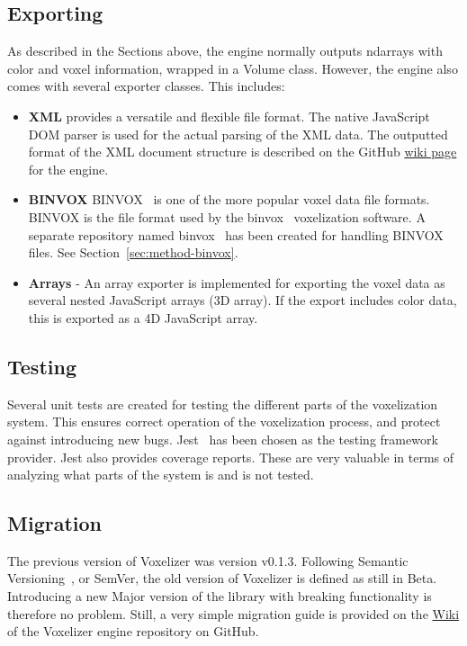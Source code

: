 \subsection{Exporting}
As described in the Sections above, the engine normally outputs ndarrays with color and voxel information, wrapped in a Volume class. However, the engine also comes with several exporter classes. This includes:
\begin{itemize}
    \item \textbf{XML} provides a versatile and flexible file format. The native JavaScript DOM parser is used for the actual parsing of the XML data. The outputted format of the XML document structure is described on the GitHub \href{https://github.com/andstor/voxelizer/wiki/XML-format}{wiki page} for the engine.
    \item \textbf{BINVOX} BINVOX~\cite{binvox-file-format} is one of the more popular voxel data file formats. BINVOX is the file format used by the binvox~\cite{binvox} voxelization software. A separate repository named binvox~\cite{andstor-binvox} has been created for handling BINVOX files. See Section~\ref{sec:method-binvox}.
    \item \textbf{Arrays} - An array exporter is implemented for exporting the voxel data as several nested JavaScript arrays (3D array). If the export includes color data, this is exported as a 4D JavaScript array.
\end{itemize}

\subsection{Testing}
Several unit tests are created for testing the different parts of the voxelization system. This ensures correct operation of the voxelization process, and protect against introducing new bugs. Jest~\cite{jest} has been chosen as the testing framework provider. Jest also provides coverage reports. These are very valuable in terms of analyzing what parts of the system is and is not tested.

\subsection{Migration}
The previous version of Voxelizer was version v0.1.3. Following Semantic Versioning~\cite{semantic-versioning}, or SemVer, the old version of Voxelizer is defined as still in Beta. Introducing a new Major version of the library with breaking functionality is therefore no problem. Still, a very simple migration guide is provided on the \href{https://github.com/andstor/voxelizer/wiki/Migration}{Wiki} of the Voxelizer engine repository on GitHub.

